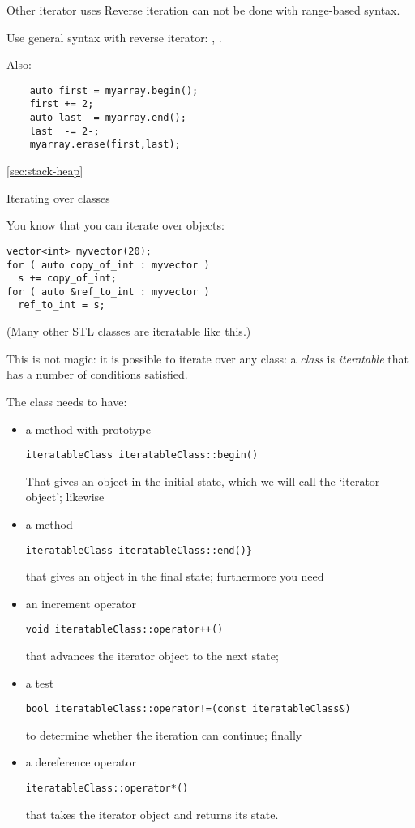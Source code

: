 \begin{block}{Other iterator uses}
  \label{sl:reverse-iterator}
  Reverse iteration can not be done with range-based syntax.
  
  Use general syntax with reverse iterator: ,
  .

  Also:
  \begin{lstlisting}
    auto first = myarray.begin();
    first += 2;
    auto last  = myarray.end();
    last  -= 2-;
    myarray.erase(first,last);
  \end{lstlisting}
\end{block}



\ref{sec:stack-heap}

 {Iterating over classes}
\label{sec:range-iter}

You know that you can iterate over  objects:
\begin{lstlisting}
vector<int> myvector(20);
for ( auto copy_of_int : myvector )
  s += copy_of_int;
for ( auto &ref_to_int : myvector )
  ref_to_int = s;
\end{lstlisting}
(Many other \ac{STL} classes are iteratable like this.)

This is not magic: it is possible to iterate over any class:
a \emph{class} is 
\emph{iteratable} that has a number of conditions satisfied.

The class needs to have:
\begin{itemize}
\item a method  with prototype
\begin{lstlisting}
iteratableClass iteratableClass::begin()
\end{lstlisting}
That gives an
  object in the initial state, which we will call the `iterator object'; likewise
\item a method 
\begin{lstlisting}
iteratableClass iteratableClass::end()} 
\end{lstlisting}
that gives an 
  object in the final state; furthermore you need
\item an increment operator
\begin{lstlisting}
void iteratableClass::operator++()
\end{lstlisting}
that
  advances the iterator object to the next state;
\item a test
\begin{lstlisting}
bool iteratableClass::operator!=(const iteratableClass&)
\end{lstlisting}
to determine
  whether the iteration can continue; finally
\item a dereference operator 
\begin{lstlisting}
iteratableClass::operator*()
\end{lstlisting}
that takes the
  iterator object and returns its state.
\end{itemize}

